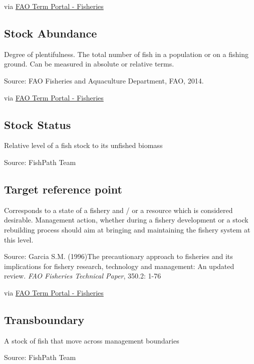 \documentclass[
  11pt,
]{book}
\begin{document}
via \href{http://www.fao.org/fishery/glossary/en}{FAO Term Portal - Fisheries}

\hypertarget{stock-abundance}{%
\subsection{Stock Abundance}\label{stock-abundance}}

Degree of plentifulness. The total number of fish in a population or on a fishing ground. Can be measured in absolute or relative terms.

Source: FAO Fisheries and Aquaculture Department, FAO, 2014.

via \href{http://www.fao.org/fishery/glossary/en}{FAO Term Portal - Fisheries}

\hypertarget{stock-status}{%
\subsection{Stock Status}\label{stock-status}}

Relative level of a fish stock to its unfished biomass

Source: FishPath Team

\hypertarget{target-reference-point}{%
\subsection{Target reference point}\label{target-reference-point}}

Corresponds to a state of a fishery and / or a resource which is considered desirable. Management action, whether during a fishery development or a stock rebuilding process should aim at bringing and maintaining the fishery system at this level.

Source: Garcia S.M. (1996)The precautionary approach to fisheries and its implications for fishery research, technology and management: An updated review. \emph{FAO Fisheries Technical Paper}, 350.2: 1-76

via \href{http://www.fao.org/fishery/glossary/en}{FAO Term Portal - Fisheries}

\hypertarget{transboundary}{%
\subsection{Transboundary}\label{transboundary}}

A stock of fish that move across management boundaries

Source: FishPath Team
\end{document}
